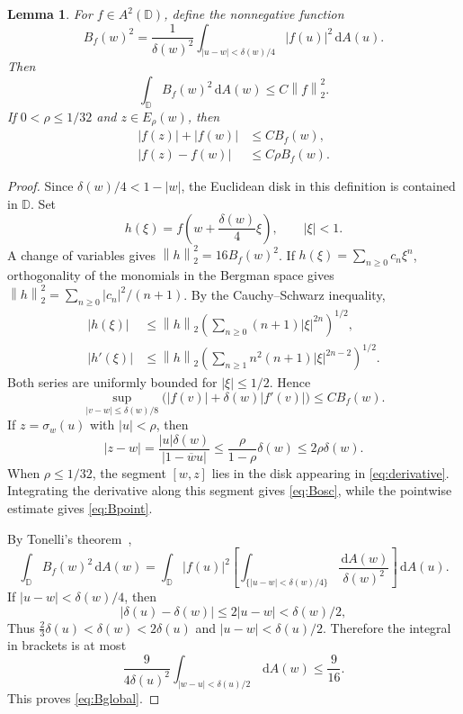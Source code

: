 \documentclass[12pt,a4paper]{article}
\newtheorem{lemma}[theorem]{Lemma}
\theoremstyle{remark}
\newcommand{\D}{\mathbb D}
\newcommand{\dA}{\,\mathrm dA}
\newcommand{\A}{A^2(\D)}
\newcommand{\norm}[1]{\left\lVert#1\right\rVert}
\begin{document}
\begin{lemma}\label{lem:oscillation}
For $f\in\A$, define the nonnegative function
\[
B_f(w)^2=\frac1{\delta(w)^2}
\int_{|u-w|<\delta(w)/4}|f(u)|^2\dA(u).
\]
Then
\begin{equation}\label{eq:Bglobal}
\int_\D B_f(w)^2\dA(w)\le C\norm f_2^2.
\end{equation}
If $0<\rho\le1/32$ and $z\in E_\rho(w)$, then
\begin{align}
|f(z)|+|f(w)|&\le C B_f(w),\label{eq:Bpoint}\\
|f(z)-f(w)|&\le C\rho B_f(w).\label{eq:Bosc}
\end{align}
\end{lemma}
\begin{proof}
Since $\delta(w)/4<1-|w|$, the Euclidean disk in this definition is contained in $\D$.
Set
\[
h(\xi)=f\left(w+\frac{\delta(w)}4\xi\right),\qquad |\xi|<1.
\]
A change of variables gives $\norm h_2^2=16B_f(w)^2$. If
$h(\xi)=\sum_{n\ge0}c_n\xi^n$, orthogonality of the monomials in the Bergman space gives
$\norm h_2^2=\sum_{n\ge0}|c_n|^2/(n+1)$.
By the Cauchy--Schwarz inequality,
\begin{align*}
|h(\xi)|&\le\norm h_2
 \left(\sum_{n\ge0}(n+1)|\xi|^{2n}\right)^{1/2},\\
|h'(\xi)|&\le\norm h_2
 \left(\sum_{n\ge1}n^2(n+1)|\xi|^{2n-2}\right)^{1/2}.
\end{align*}
Both series are uniformly bounded for $|\xi|\le1/2$. Hence
\begin{equation}\label{eq:derivative}
\sup_{|v-w|\le\delta(w)/8}
\bigl(|f(v)|+\delta(w)|f'(v)|\bigr)\le C B_f(w).
\end{equation}
If $z=\sigma_w(u)$ with $|u|<\rho$, then
\[
|z-w|=\frac{|u|\delta(w)}{|1-\overline w u|}
\le\frac{\rho}{1-\rho}\delta(w)\le2\rho\delta(w).
\]
When $\rho\le1/32$, the segment $[w,z]$ lies in the disk appearing in \eqref{eq:derivative}.
Integrating the derivative along this segment gives \eqref{eq:Bosc}, while the pointwise estimate gives \eqref{eq:Bpoint}.

By Tonelli's theorem~\cite[Theorem~5.28]{Axler2020},
\[
\int_\D B_f(w)^2\dA(w)
=\int_\D|f(u)|^2
\left[\int_{\{|u-w|<\delta(w)/4\}}\frac{\dA(w)}{\delta(w)^2}\right]\dA(u).
\]
If $|u-w|<\delta(w)/4$, then
\[
|\delta(u)-\delta(w)|\le2|u-w|<\delta(w)/2,
\]
Thus $\tfrac23\delta(u)<\delta(w)<2\delta(u)$ and
$|u-w|<\delta(u)/2$. Therefore the integral in brackets is at most
\[
\frac9{4\delta(u)^2}\int_{|w-u|<\delta(u)/2}\dA(w)
\le\frac9{16}.
\]
This proves \eqref{eq:Bglobal}.
\end{proof}
\end{document}
